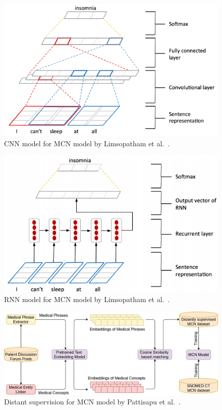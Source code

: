 \begin{figure}[h]
	\centering
	\includegraphics[width=0.99\linewidth]{Figures/p.png}
	\caption{CNN model for MCN model by Limsopatham et al.~\cite{limsopatham2016normalising}.}
	\label{fig:cnn-medication-concept-normalization}
\end{figure}

\begin{figure}[h]
	\centering
	\includegraphics[width=0.99\linewidth]{Figures/q.png}
	\caption{RNN model for MCN model by Limsopatham et al.~\cite{limsopatham2016normalising}.}
	\label{fig:rnn-medication-concept-normalization}
\end{figure}

\begin{figure}[h]
	\centering
	\includegraphics[width=0.99\linewidth]{Figures/o.jpg}
	\caption{Distant supervision for MCN model by Pattisapu et al.~\cite{PATTISAPU2020103522}.}
	\label{fig:medication-concept-normalization}
\end{figure}
